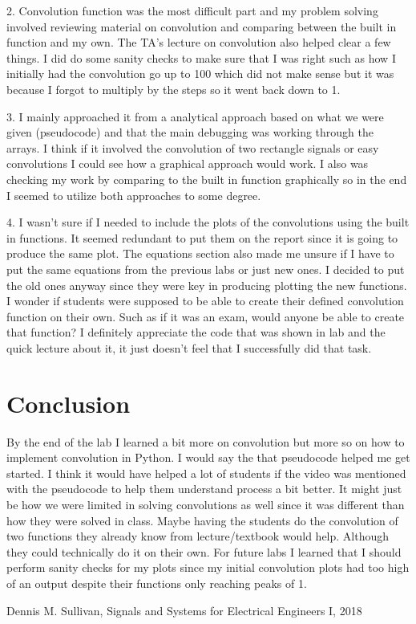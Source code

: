 \documentclass[12pt]{report}
\begin{document}
2. Convolution function was the most difficult part and my problem solving involved reviewing material on convolution and comparing between the built in function and my own. The TA's lecture on convolution also helped clear a few things. I did do some sanity checks to make sure that I was right such as how I initially had the convolution go up to 100 which did not make sense but it was because I forgot to multiply by the steps so it went back down to 1. 

3. I mainly approached it from a analytical approach based on what we were given (pseudocode) and that the main debugging was working through the arrays. I think if it involved the convolution of two rectangle signals or easy convolutions I could see how a graphical approach would work. I also was checking my work by comparing to the built in function graphically so in the end I seemed to utilize both approaches to some degree.  

4. I wasn't sure if I needed to include the plots of the convolutions using the built in functions. It seemed redundant to put them on the report since it is going to produce the same plot. The equations section also made me unsure if I have to put the same equations from the previous labs or just new ones. I decided to put the old ones anyway since they were key in producing plotting the new functions.  I wonder if students were supposed to be able to create their defined convolution function on their own. Such as if it was an exam, would anyone be able to create that function? I definitely appreciate the code that was shown in lab and the quick lecture about it, it just doesn't feel that I successfully did that task. 

\section{Conclusion}

By the end of the lab I learned a bit more on convolution but more so on how to implement convolution in Python. I would say the that pseudocode helped me get started. I think it would have helped a lot of students if the video was mentioned with the pseudocode to help them understand process a bit better. It might just be how we were limited in solving convolutions as well since it was different than how they were solved in class. Maybe having the students do the convolution of two functions they already know from lecture/textbook would help. Although they could technically do it on their own. For future labs I learned that I should perform sanity checks for my plots since my initial convolution plots had too high of an output despite their functions only reaching peaks of 1.  

\newpage


\begin{thebibliography}{111}
Dennis M. Sullivan,
Signals and Systems for Electrical Engineers I,
 2018
\end{thebibliography}
\end{document}
